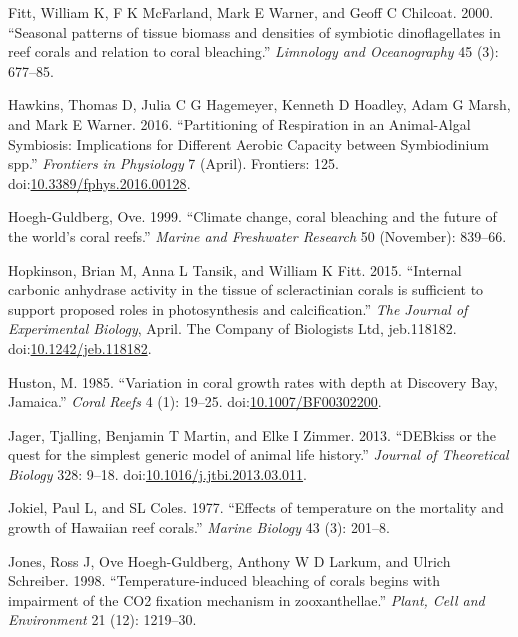 \documentclass[]{elsarticle} %
\begin{document}
\hypertarget{ref-Fitt:2000p3792}{}
Fitt, William K, F K McFarland, Mark E Warner, and Geoff C Chilcoat.
2000. ``Seasonal patterns of tissue biomass and densities of symbiotic
dinoflagellates in reef corals and relation to coral bleaching.''
\emph{Limnology and Oceanography} 45 (3): 677--85.

\hypertarget{ref-Hawkins:2016jj}{}
Hawkins, Thomas D, Julia C G Hagemeyer, Kenneth D Hoadley, Adam G Marsh,
and Mark E Warner. 2016. ``Partitioning of Respiration in an
Animal-Algal Symbiosis: Implications for Different Aerobic Capacity
between Symbiodinium spp.'' \emph{Frontiers in Physiology} 7 (April).
Frontiers: 125.
doi:\href{https://doi.org/10.3389/fphys.2016.00128}{10.3389/fphys.2016.00128}.

\hypertarget{ref-HoeghGuldberg:1999p4222}{}
Hoegh-Guldberg, Ove. 1999. ``Climate change, coral bleaching and the
future of the world's coral reefs.'' \emph{Marine and Freshwater
Research} 50 (November): 839--66.

\hypertarget{ref-Hopkinson:2015ev}{}
Hopkinson, Brian M, Anna L Tansik, and William K Fitt. 2015. ``Internal
carbonic anhydrase activity in the tissue of scleractinian corals is
sufficient to support proposed roles in photosynthesis and
calcification.'' \emph{The Journal of Experimental Biology}, April. The
Company of Biologists Ltd, jeb.118182.
doi:\href{https://doi.org/10.1242/jeb.118182}{10.1242/jeb.118182}.

\hypertarget{ref-Huston:1985ec}{}
Huston, M. 1985. ``Variation in coral growth rates with depth at
Discovery Bay, Jamaica.'' \emph{Coral Reefs} 4 (1): 19--25.
doi:\href{https://doi.org/10.1007/BF00302200}{10.1007/BF00302200}.

\hypertarget{ref-Jager:2013bj}{}
Jager, Tjalling, Benjamin T Martin, and Elke I Zimmer. 2013. ``DEBkiss
or the quest for the simplest generic model of animal life history.''
\emph{Journal of Theoretical Biology} 328: 9--18.
doi:\href{https://doi.org/10.1016/j.jtbi.2013.03.011}{10.1016/j.jtbi.2013.03.011}.

\hypertarget{ref-Jokiel:1977p7353}{}
Jokiel, Paul L, and SL Coles. 1977. ``Effects of temperature on the
mortality and growth of Hawaiian reef corals.'' \emph{Marine Biology} 43
(3): 201--8.

\hypertarget{ref-Jones:1998p3572}{}
Jones, Ross J, Ove Hoegh-Guldberg, Anthony W D Larkum, and Ulrich
Schreiber. 1998. ``Temperature-induced bleaching of corals begins with
impairment of the CO2 fixation mechanism in zooxanthellae.''
\emph{Plant, Cell and Environment} 21 (12): 1219--30.
\end{document}

